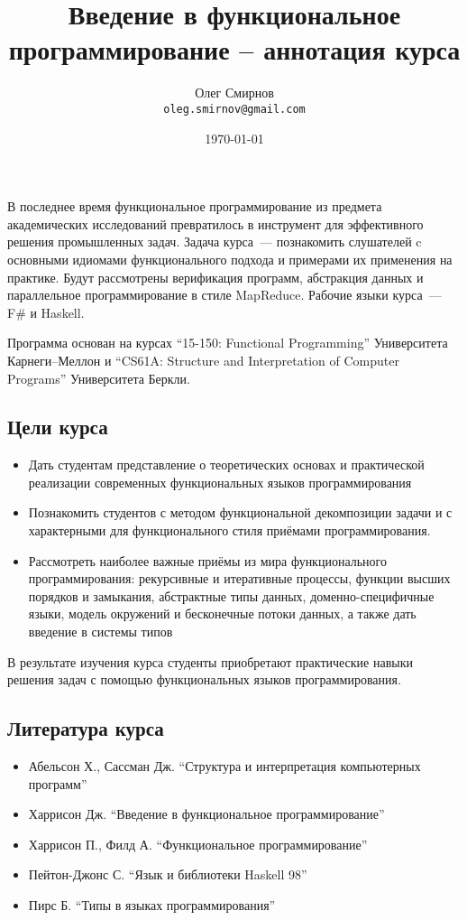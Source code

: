 \documentclass[a4paper,11pt]{article}
\author{Олег Смирнов \\
\texttt{oleg.smirnov@gmail.com}}
\title{Введение в функциональное программирование -- аннотация курса}
\date{\today}
\begin{document}
\maketitle
В последнее время функциональное программирование из предмета 
академических исследований превратилось в инструмент для эффективного
решения промышленных задач. Задача курса~--- познакомить слушателей
c основными идиомами функционального подхода и примерами их
применения на практике. Будут рассмотрены верификация программ,
абстракция данных и параллельное программирование в стиле MapReduce.
Рабочие языки курса~--- F\# и Haskell.

Программа основан на курсах ``15-150: Functional Programming'' 
Университета Карнеги--Меллон и ``CS61A: Structure and Interpretation
of Computer Programs'' Университета Беркли.

\subsection*{Цели курса}
\begin{itemize}
\item Дать студентам представление о теоретических основах и практической
реализации современных функциональных языков программирования
\item Познакомить студентов с методом функциональной декомпозиции задачи
и с характерными для функционального стиля приёмами программирования.
\item Рассмотреть наиболее важные приёмы из мира функционального
программирования: рекурсивные и итеративные процессы, функции высших порядков
и замыкания, абстрактные типы данных, доменно-специфичные языки, модель
окружений и бесконечные потоки данных, а также дать введение в системы типов
\end{itemize}

В результате изучения курса студенты приобретают практические навыки
решения задач с помощью функциональных языков программирования.

\subsection*{Литература курса}
\begin{itemize}
\item Абельсон Х., Сассман Дж. ``Структура и интерпретация компьютерных программ''
\item Харрисон Дж. ``Введение в функциональное программирование''
\item Харрисон П., Филд А. ``Функциональное программирование''
\item Пейтон-Джонс С. ``Язык и библиотеки Haskell 98''
\item Пирс Б. ``Типы в языках программирования''
\end{itemize}
\end{document}
